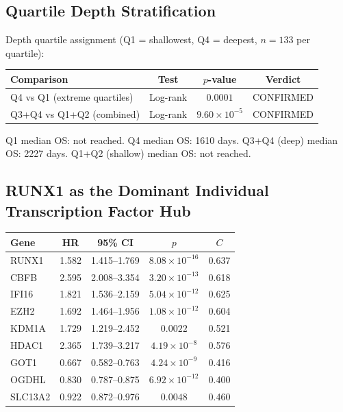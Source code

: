 \documentclass[11pt, a4paper]{article}
\begin{document}
\subsection{Quartile Depth Stratification}

Depth quartile assignment (Q1 = shallowest,
Q4 = deepest, $n = 133$ per quartile):

\begin{center}
\begin{tabular}{lccc}
\toprule
\textbf{Comparison} &
\textbf{Test} &
\textbf{$p$-value} &
\textbf{Verdict} \\
\midrule
Q4 vs Q1 (extreme quartiles) &
Log-rank &
$0.0001$ &
CONFIRMED \\[0.3em]
Q3+Q4 vs Q1+Q2 (combined) &
Log-rank &
$9.60 \times 10^{-5}$ &
CONFIRMED \\
\bottomrule
\end{tabular}
\end{center}

Q1 median OS: not reached.
Q4 median OS: 1610 days.
Q3+Q4 (deep) median OS: 2227 days.
Q1+Q2 (shallow) median OS: not reached.

\subsection{RUNX1 as the Dominant Individual
Transcription Factor Hub}

\begin{center}
\begin{tabular}{lcccc}
\toprule
\textbf{Gene} & \textbf{HR} &
\textbf{95\% CI} &
\textbf{$p$} &
\textbf{$C$} \\
\midrule
RUNX1 & 1.582 & 1.415--1.769 &
$8.08 \times 10^{-16}$ & 0.637 \\
CBFB  & 2.595 & 2.008--3.354 &
$3.20 \times 10^{-13}$ & 0.618 \\
IFI16 & 1.821 & 1.536--2.159 &
$5.04 \times 10^{-12}$ & 0.625 \\
EZH2  & 1.692 & 1.464--1.956 &
$1.08 \times 10^{-12}$ & 0.604 \\
KDM1A & 1.729 & 1.219--2.452 &
$0.0022$ & 0.521 \\
HDAC1 & 2.365 & 1.739--3.217 &
$4.19 \times 10^{-8}$ & 0.576 \\
GOT1  & 0.667 & 0.582--0.763 &
$4.24 \times 10^{-9}$ & 0.416 \\
OGDHL & 0.830 & 0.787--0.875 &
$6.92 \times 10^{-12}$ & 0.400 \\
SLC13A2 & 0.922 & 0.872--0.976 &
$0.0048$ & 0.460 \\
\bottomrule
\end{tabular}
\end{center}
\end{document}
